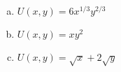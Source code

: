 \documentclass[11pt]{article}
\begin{document}
\begin{enumerate}
\begin{multicols}{2}
\begin{enumerate}[(a)]
      \vspace*{80mm}
      \item $U(x,y) = 6x^{1/3}y^{2/3}$
      
      \vspace*{80mm}
      \item $U(x,y) = xy^2$
      
      \vspace*{80mm}
      \item $U(x,y) = \sqrt{x} + 2\sqrt{y}$
    \end{enumerate}
  \end{multicols}
\end{enumerate}
\end{document}
